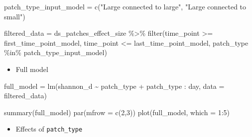 \documentclass[
]{article}
\newenvironment{Shaded}{\begin{snugshade}}{\end{snugshade}}
\newcommand{\AttributeTok}[1]{\textcolor[rgb]{0.77,0.63,0.00}{#1}}
\newcommand{\DecValTok}[1]{\textcolor[rgb]{0.00,0.00,0.81}{#1}}
\newcommand{\FunctionTok}[1]{\textcolor[rgb]{0.00,0.00,0.00}{#1}}
\newcommand{\NormalTok}[1]{#1}
\newcommand{\OtherTok}[1]{\textcolor[rgb]{0.56,0.35,0.01}{#1}}
\newcommand{\SpecialCharTok}[1]{\textcolor[rgb]{0.00,0.00,0.00}{#1}}
\newcommand{\StringTok}[1]{\textcolor[rgb]{0.31,0.60,0.02}{#1}}
\providecommand{\tightlist}{%
  \setlength{\itemsep}{0pt}\setlength{\parskip}{0pt}}
\begin{document}
\begin{Shaded}
\begin{Highlighting}[]
\NormalTok{patch\_type\_input\_model }\OtherTok{=} \FunctionTok{c}\NormalTok{(}\StringTok{"Large connected to large"}\NormalTok{,}
                                 \StringTok{"Large connected to small"}\NormalTok{)}

\NormalTok{filtered\_data }\OtherTok{=}\NormalTok{ ds\_patches\_effect\_size }\SpecialCharTok{\%\textgreater{}\%}
                         \FunctionTok{filter}\NormalTok{(time\_point }\SpecialCharTok{\textgreater{}=}\NormalTok{ first\_time\_point\_model,}
\NormalTok{                                time\_point }\SpecialCharTok{\textless{}=}\NormalTok{ last\_time\_point\_model,}
\NormalTok{                                patch\_type }\SpecialCharTok{\%in\%}\NormalTok{ patch\_type\_input\_model)}
\end{Highlighting}
\end{Shaded}

\begin{itemize}
\tightlist
\item
  Full model
\end{itemize}

\begin{Shaded}
\begin{Highlighting}[]
\NormalTok{full\_model }\OtherTok{=} \FunctionTok{lm}\NormalTok{(shannon\_d }\SpecialCharTok{\textasciitilde{}}                  
\NormalTok{                  patch\_type }\SpecialCharTok{+}
\NormalTok{                  patch\_type }\SpecialCharTok{:}\NormalTok{ day,}
                  \AttributeTok{data =}\NormalTok{ filtered\_data)}

\FunctionTok{summary}\NormalTok{(full\_model)}
\FunctionTok{par}\NormalTok{(}\AttributeTok{mfrow =} \FunctionTok{c}\NormalTok{(}\DecValTok{2}\NormalTok{,}\DecValTok{3}\NormalTok{))}
\FunctionTok{plot}\NormalTok{(full\_model, }\AttributeTok{which =} \DecValTok{1}\SpecialCharTok{:}\DecValTok{5}\NormalTok{)}
\end{Highlighting}
\end{Shaded}

\begin{itemize}
\tightlist
\item
  Effects of \texttt{patch\_type}
\end{itemize}
\end{document}
